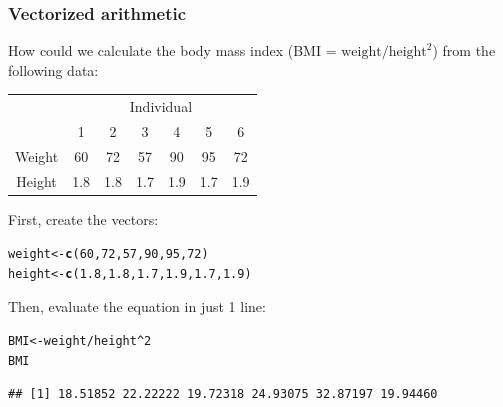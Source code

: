 \documentclass[color=usenames,dvipsnames]{beamer}\usepackage[]{graphicx}\usepackage[]{color}
\makeatletter
\newcommand{\hlnum}[1]{\textcolor[rgb]{0.686,0.059,0.569}{#1}}%
\newcommand{\hlopt}[1]{\textcolor[rgb]{0,0,0}{#1}}%
\newcommand{\hlstd}[1]{\textcolor[rgb]{0.345,0.345,0.345}{#1}}%
\newcommand{\hlkwb}[1]{\textcolor[rgb]{0.69,0.353,0.396}{#1}}%
\newcommand{\hlkwd}[1]{\textcolor[rgb]{0.737,0.353,0.396}{\textbf{#1}}}%
\newenvironment{kframe}{%
 \def\at@end@of@kframe{}%
 \ifinner\ifhmode%
  \def\at@end@of@kframe{\end{minipage}}%
  \begin{minipage}{\columnwidth}%
 \fi\fi%
 \def\FrameCommand##1{\hskip\@totalleftmargin \hskip-\fboxsep
 \colorbox{shadecolor}{##1}\hskip-\fboxsep
     \hskip-\linewidth \hskip-\@totalleftmargin \hskip\columnwidth}%
 \MakeFramed {\advance\hsize-\width
   \@totalleftmargin\z@ \linewidth\hsize
   \@setminipage}}%
 {\par\unskip\endMakeFramed%
 \at@end@of@kframe}
\newenvironment{knitrout}{}{} %
\makeatother
\begin{document}
\begin{frame}[fragile]
  \frametitle{Vectorized arithmetic}
  How could we calculate the body mass index (BMI = $\text{weight}/\text{height}^2$) from the following data:
  \begin{center}
    \begin{tabular}{ccccccc}
      \hline
      & \multicolumn{6}{c}{Individual} \\
      \cline{2-7}
      & 1 & 2 & 3 & 4 & 5 & 6 \\
      \hline
      Weight & 60 & 72 & 57 & 90 & 95 & 72 \\
      Height & 1.8 & 1.8 & 1.7 & 1.9 & 1.7 & 1.9 \\
      \hline
    \end{tabular}
  \end{center}
  \pause
  First, create the vectors:
\begin{knitrout}
\color{fgcolor}\begin{kframe}
\begin{alltt}
\hlstd{weight} \hlkwb{<-} \hlkwd{c}\hlstd{(}\hlnum{60}\hlstd{,} \hlnum{72}\hlstd{,} \hlnum{57}\hlstd{,} \hlnum{90}\hlstd{,} \hlnum{95}\hlstd{,} \hlnum{72}\hlstd{)}
\hlstd{height} \hlkwb{<-} \hlkwd{c}\hlstd{(}\hlnum{1.8}\hlstd{,} \hlnum{1.8}\hlstd{,} \hlnum{1.7}\hlstd{,} \hlnum{1.9}\hlstd{,} \hlnum{1.7}\hlstd{,} \hlnum{1.9}\hlstd{)}
\end{alltt}
\end{kframe}
\end{knitrout}
  \pause
  Then, evaluate the equation in just 1 line:
\begin{knitrout}
\color{fgcolor}\begin{kframe}
\begin{alltt}
\hlstd{BMI} \hlkwb{<-} \hlstd{weight}\hlopt{/}\hlstd{height}\hlopt{^}\hlnum{2}
\hlstd{BMI}
\end{alltt}
\begin{verbatim}
## [1] 18.51852 22.22222 19.72318 24.93075 32.87197 19.94460
\end{verbatim}
\end{kframe}
\end{knitrout}
\end{frame}
\end{document}
